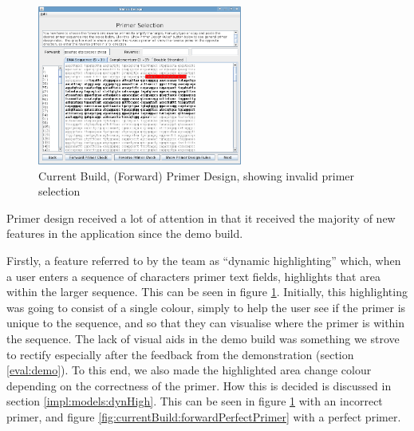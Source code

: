 \begin{figure}[!t]
  \begin{center}
    \includegraphics[width=0.6\textwidth]{./images/currentBuild/forwardPrimerDesignRed.png}
    \caption{
      \label{fig:currentBuild:forwardPrimerDesignRed}
      Current Build, (Forward) Primer Design, showing invalid primer selection
    }
  \end{center}
\end{figure}

Primer design received a lot of attention in that it received the
majority of new features in the application since the demo build.

Firstly, a feature referred to by the team as ``dynamic highlighting''
which, when a user enters a sequence of characters primer text fields,
highlights that area within the larger sequence. This can be
seen in figure \ref{fig:currentBuild:forwardPrimerDesignRed}.
Initially, this highlighting was going to consist of a single colour, 
simply to help the user see if the primer is unique to the sequence, 
and so that they can visualise where the primer is within the sequence.
The lack of visual aids in the demo build was something we strove to
rectify especially after the feedback from the demonstration (section
\ref{eval:demo}).
To this end, we also made the highlighted area change colour depending 
on the correctness of the primer. How this is decided is discussed in 
section \ref{impl:models:dynHigh}.
This can be seen in figure \ref{fig:currentBuild:forwardPrimerDesignRed} 
with an incorrect primer, and figure \ref{fig:currentBuild:forwardPerfectPrimer} 
with a perfect primer.

